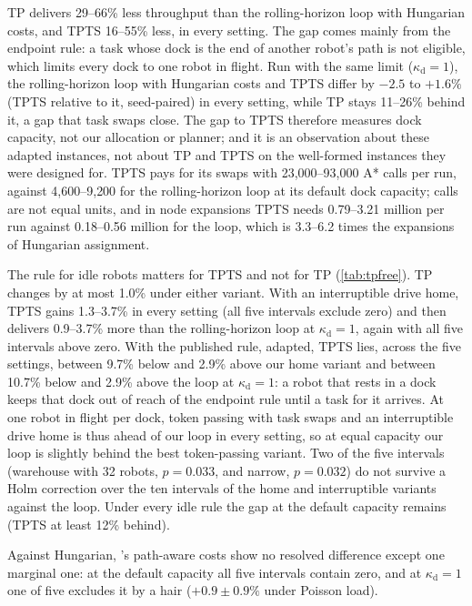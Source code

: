 TP delivers 29--66\% less throughput than the rolling-horizon loop with
Hungarian costs, and TPTS 16--55\% less, in every setting. The gap comes mainly
from the endpoint rule:
a task whose dock is the end of another robot's path is not eligible, which
limits every dock to one robot in flight. Run with the same limit
($\kappa_{\mathrm{d}}=1$), the rolling-horizon loop with Hungarian costs
and TPTS differ by $-2.5$ to $+1.6\%$ (TPTS relative to it, seed-paired) in
every setting, while TP stays 11--26\% behind it, a gap that task swaps
close. The gap to TPTS therefore measures dock capacity, not our allocation
or planner; and it is an observation about these adapted instances, not
about TP and TPTS on the well-formed instances they were designed for. TPTS pays for its swaps with 23{,}000--93{,}000 A*
calls per run, against 4{,}600--9{,}200 for the rolling-horizon loop at its
default dock capacity; calls are not equal units, and in node expansions TPTS
needs 0.79--3.21 million per run against 0.18--0.56 million for the loop, which
is 3.3--6.2 times the expansions of Hungarian assignment.


The rule for idle robots matters for TPTS and not for TP
(\cref{tab:tpfree}). TP changes by at most 1.0\% under either variant. With
an interruptible drive home, TPTS gains 1.3--3.7\% in every setting (all
five intervals exclude zero) and then delivers 0.9--3.7\% more than the
rolling-horizon loop at $\kappa_{\mathrm{d}}=1$, again with all five
intervals above zero. With the published rule, adapted, TPTS lies, across the five settings, between 9.7\%
below and 2.9\% above our home variant and between 10.7\% below and 2.9\%
above the loop at $\kappa_{\mathrm{d}}=1$: a robot that rests in a dock keeps
that dock out of reach of the endpoint rule until a task for it arrives. At
one robot in flight per dock, token passing with task swaps and an
interruptible drive home is thus ahead of our loop in every setting, so at equal
capacity our loop is slightly behind the best token-passing variant. Two of
the five intervals (warehouse with 32 robots, $p=0.033$, and narrow, $p=0.032$)
do not survive a Holm correction over the ten intervals of the home and
interruptible variants against the loop. Under every idle rule the gap at the default
capacity remains (TPTS at least 12\% behind).

Against Hungarian, \sname's path-aware costs show no resolved difference
except one marginal one: at the default capacity all five intervals contain
zero, and at $\kappa_{\mathrm{d}}=1$
one of five excludes it by a hair ($+0.9\pm0.9\%$ under Poisson load).

